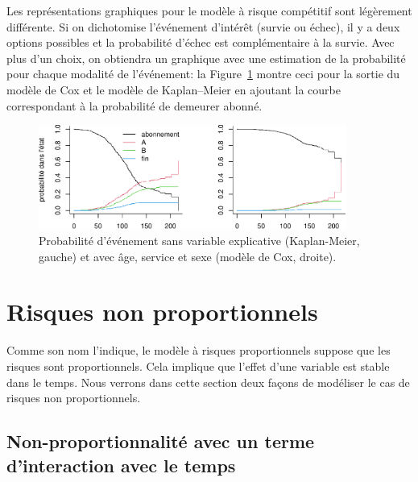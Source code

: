 \documentclass[
  11pt,
  letterpaper,
]{book}
\theoremstyle{definition}
\theoremstyle{remark}
\begin{document}
Les représentations graphiques pour le modèle à risque compétitif sont
légèrement différente. Si on dichotomise l'événement d'intérêt (survie
ou échec), il y a deux options possibles et la probabilité d'échec est
complémentaire à la survie. Avec plus d'un choix, on obtiendra un
graphique avec une estimation de la probabilité pour chaque modalité de
l'événement: la Figure~\ref{fig-competitif} montre ceci pour la sortie
du modèle de Cox et le modèle de Kaplan--Meier en ajoutant la courbe
correspondant à la probabilité de demeurer abonné.

\begin{figure}[ht!]

{\centering \includegraphics[width=0.9\textwidth,height=\textheight]{./06-survie_files/figure-pdf/fig-competitif-1.pdf}

}

\caption{\label{fig-competitif}Probabilité d'événement sans variable
explicative (Kaplan-Meier, gauche) et avec âge, service et sexe (modèle
de Cox, droite).}

\end{figure}

\hypertarget{risques-non-proportionnels}{%
\section{Risques non proportionnels}\label{risques-non-proportionnels}}

Comme son nom l'indique, le modèle à risques proportionnels suppose que
les risques sont proportionnels. Cela implique que l'effet d'une
variable est stable dans le temps. Nous verrons dans cette section deux
façons de modéliser le cas de risques non proportionnels.

\hypertarget{non-proportionnalituxe9-avec-un-terme-dinteraction-avec-le-temps}{%
\subsection{Non-proportionnalité avec un terme d'interaction avec le
temps}\label{non-proportionnalituxe9-avec-un-terme-dinteraction-avec-le-temps}}
\end{document}
